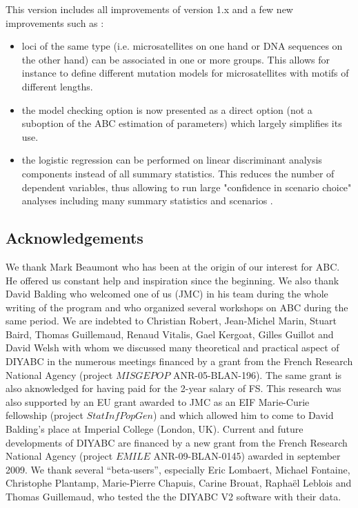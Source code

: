 \documentclass [a4paper]{report}
\let\subsectionv\subsection
\renewcommand{\subsection}[1]{\subsectionv{#1} \setcounter{paragraph}{0}}
\begin{document}
This version includes all improvements of version 1.x and a few new improvements such as :
\begin{itemize}
\item loci of the same type (i.e. microsatellites on one hand or DNA sequences on the other hand) can be associated in one or more groups. This allows for instance to define different mutation models for microsatellites with motifs of different lengths.
\item  the model checking option is now presented as a direct option (not a suboption of the ABC estimation of parameters) which largely simplifies its use.
\item the logistic regression can be performed on linear discriminant analysis components instead of all summary statistics. This reduces the number of dependent variables, thus allowing to run large "confidence in scenario choice" analyses including many summary statistics and scenarios \citep{EL2012}.
\end{itemize}

\subsection{Acknowledgements}
We thank Mark Beaumont who has been at the origin of our interest for ABC. He offered us constant help and inspiration since the beginning. We also thank David Balding who welcomed one of us (JMC) in his team during the whole writing of the program and who organized several workshops on ABC during the same period. We are indebted to Christian Robert, Jean-Michel Marin, Stuart Baird, Thomas Guillemaud, Renaud Vitalis, Gael Kergoat, Gilles Guillot and David Welsh with whom we discussed many theoretical and practical aspect of DIYABC in the numerous meetings financed by a grant from the French Research National Agency (project $MISGEPOP$ ANR-05-BLAN-196). The same grant is also aknowledged for having paid for the 2-year salary of FS. This research was also supported by an EU grant awarded to JMC as an EIF Marie-Curie fellowship (project $StatInfPopGen$) and which allowed him to come to David Balding's place at Imperial College (London, UK). Current and future developments of DIYABC are financed by a new grant from the French Research National Agency (project $EMILE$ ANR-09-BLAN-0145) awarded in september 2009. We thank several “beta-users”, especially Eric Lombaert, Michael Fontaine, Christophe Plantamp, Marie-Pierre Chapuis, Carine Brouat, Raphaël Leblois and Thomas Guillemaud, who tested the the DIYABC V2 software with their data.
\end{document}
